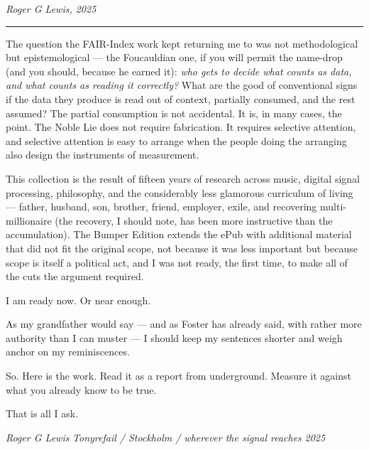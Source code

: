 \emph{Roger G Lewis, 2025}

\begin{center}\rule{0.5\linewidth}{0.5pt}\end{center}

The question the FAIR-Index work kept returning me to was not
methodological but epistemological --- the Foucauldian one, if you will
permit the name-drop (and you should, because he earned it): \emph{who
gets to decide what counts as data, and what counts as reading it
correctly?} What are the good of conventional signs if the data they
produce is read out of context, partially consumed, and the rest
assumed? The partial consumption is not accidental. It is, in many
cases, the point. The Noble Lie does not require fabrication. It
requires selective attention, and selective attention is easy to arrange
when the people doing the arranging also design the instruments of
measurement.

This collection is the result of fifteen years of research across music,
digital signal processing, philosophy, and the considerably less
glamorous curriculum of living --- father, husband, son, brother,
friend, employer, exile, and recovering multi-millionaire (the recovery,
I should note, has been more instructive than the accumulation). The
Bumper Edition extends the ePub with additional material that did not
fit the original scope, not because it was less important but because
scope is itself a political act, and I was not ready, the first time, to
make all of the cuts the argument required.

I am ready now. Or near enough.

As my grandfather would say --- and as Foster has already said, with
rather more authority than I can muster --- I should keep my sentences
shorter and weigh anchor on my reminiscences.

So. Here is the work. Read it as a report from underground. Measure it
against what you already know to be true.

That is all I ask.

\emph{Roger G Lewis} \emph{Tonyrefail / Stockholm / wherever the signal
reaches} \emph{2025}
